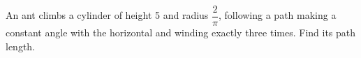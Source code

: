An ant climbs a cylinder of height 5 and radius $\dfrac{2}{\pi}$, following a path making a constant angle with the horizontal and winding exactly three times. Find its path length.
